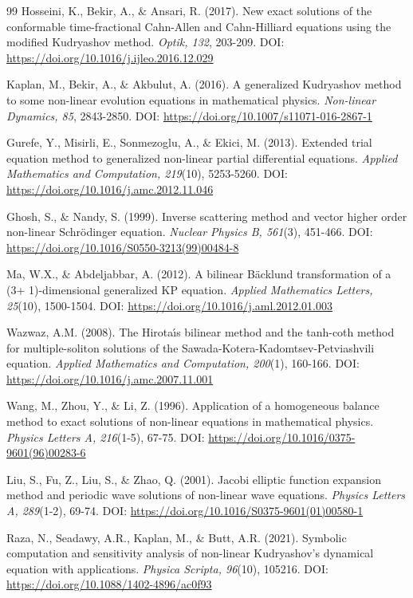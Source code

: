 \documentclass[10pt]{NSP1}
\numberwithin{equation}{section}
\begin{document}
\begin{thebibliography}{99}
 Hosseini, K., Bekir, A., ${\&}$ Ansari, R. (2017). New exact solutions of the conformable time-fractional Cahn-Allen and Cahn-Hilliard equations using the modified Kudryashov method. \emph{Optik, 132}, 203-209. DOI: \url{https://doi.org/10.1016/j.ijleo.2016.12.029}

 Kaplan, M., Bekir, A., ${\&}$ Akbulut, A. (2016). A generalized Kudryashov method to some non-linear evolution equations in mathematical physics. \emph{Non-linear Dynamics, 85}, 2843-2850. DOI: \url{https://doi.org/10.1007/s11071-016-2867-1}

 Gurefe, Y., Misirli, E., Sonmezoglu, A., ${\&}$ Ekici, M. (2013). Extended trial equation method to generalized non-linear partial differential equations. \emph{Applied Mathematics and Computation, 219}(10), 5253-5260. DOI: \url{https://doi.org/10.1016/j.amc.2012.11.046}

 Ghosh, S., ${\&}$ Nandy, S. (1999). Inverse scattering method and vector higher order non-linear Schr\"{o}dinger equation. \emph{Nuclear Physics B, 561}(3), 451-466. DOI: \url{https://doi.org/10.1016/S0550-3213(99)00484-8}

 Ma, W.X., ${\&}$ Abdeljabbar, A. (2012). A bilinear B\"{a}cklund transformation of a (3+ 1)-dimensional generalized KP equation. \emph{Applied Mathematics Letters, 25}(10), 1500-1504. DOI: \url{https://doi.org/10.1016/j.aml.2012.01.003}

 Wazwaz, A.M. (2008). The Hirota\'{\i}s bilinear method and the tanh-coth method for multiple-soliton solutions of the Sawada-Kotera-Kadomtsev-Petviashvili equation. \emph{Applied Mathematics and Computation, 200}(1), 160-166. DOI: \url{https://doi.org/10.1016/j.amc.2007.11.001}

 Wang, M., Zhou, Y., ${\&}$ Li, Z. (1996). Application of a homogeneous balance method to exact solutions of non-linear equations in mathematical physics. \emph{Physics Letters A, 216}(1-5), 67-75. DOI: \url{https://doi.org/10.1016/0375-9601(96)00283-6}

 Liu, S., Fu, Z., Liu, S., ${\&}$ Zhao, Q. (2001). Jacobi elliptic function expansion method and periodic wave solutions of non-linear wave equations. \emph{Physics Letters A, 289}(1-2), 69-74. DOI: \url{https://doi.org/10.1016/S0375-9601(01)00580-1}

 Raza, N., Seadawy, A.R., Kaplan, M., ${\&}$ Butt, A.R. (2021). Symbolic computation and sensitivity analysis of non-linear Kudryashov's dynamical equation with applications. \emph{Physica Scripta, 96}(10), 105216. DOI: \url{https://doi.org/10.1088/1402-4896/ac0f93}


\end{thebibliography}
\end{document}
